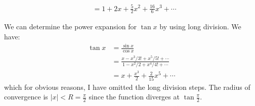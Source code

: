 \begin{itemize}
\begin{example}
\begin{align}
            &= 1 + 2x + \frac{5}{2}x^2 + \frac{16}{6}x^3 + \cdots 
        \end{align}
    \end{example}
    \begin{example}
        We can determine the power expansion for $\tan x$ by using long division. We have:
        \begin{align}
            \tan x &= \frac{\sin x}{\cos x} \\ 
            &= \frac{x-x^3/3! + x^5/5! + \cdots}{1-x^2/2 + x^4/4! + \cdots} \\ 
            &= x + \frac{x^3}{2} + \frac{2}{15}x^5 + \cdots 
        \end{align}
        which for obvious reasons, I have omitted the long division steps. The radius of convergence is $|x|<R=\frac{\pi}{2}$ since the function diverges at $\tan \frac{\pi}{2}$.
    \end{example}
\end{itemize}